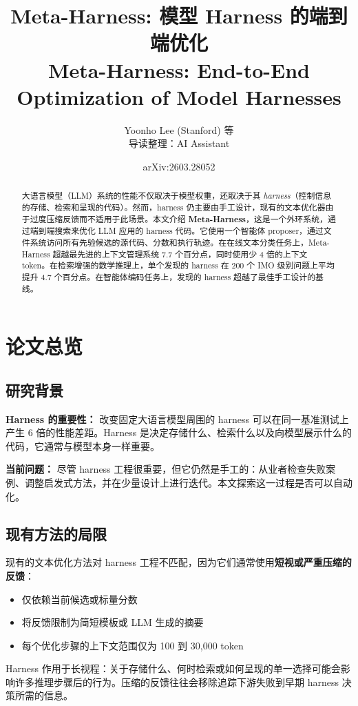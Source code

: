 \documentclass[12pt,a4paper]{article}
\title{\huge Meta-Harness: 模型 Harness 的端到端优化\\[0.5em] \large Meta-Harness: End-to-End Optimization of Model Harnesses}
\author{Yoonho Lee (Stanford) 等\\[0.2cm]\small 导读整理：AI Assistant}
\date{arXiv:2603.28052}
\begin{document}
\maketitle
\begin{abstract}
大语言模型（LLM）系统的性能不仅取决于模型权重，还取决于其 \textit{harness}（控制信息的存储、检索和呈现的代码）。然而，harness 仍主要由手工设计，现有的文本优化器由于过度压缩反馈而不适用于此场景。本文介绍 \textbf{Meta-Harness}，这是一个外环系统，通过端到端搜索来优化 LLM 应用的 harness 代码。它使用一个智能体 proposer，通过文件系统访问所有先验候选的源代码、分数和执行轨迹。在在线文本分类任务上，Meta-Harness 超越最先进的上下文管理系统 7.7 个百分点，同时使用少 4 倍的上下文 token。在检索增强的数学推理上，单个发现的 harness 在 200 个 IMO 级别问题上平均提升 4.7 个百分点。在智能体编码任务上，发现的 harness 超越了最佳手工设计的基线。
\end{abstract}
\tableofcontents
\newpage

\section{论文总览}

\subsection{研究背景}

\textbf{Harness 的重要性：} 改变固定大语言模型周围的 harness 可以在同一基准测试上产生 6 倍的性能差距。Harness 是决定存储什么、检索什么以及向模型展示什么的代码，它通常与模型本身一样重要。

\textbf{当前问题：} 尽管 harness 工程很重要，但它仍然是手工的：从业者检查失败案例、调整启发式方法，并在少量设计上进行迭代。本文探索这一过程是否可以自动化。

\subsection{现有方法的局限}

现有的文本优化方法对 harness 工程不匹配，因为它们通常使用\textbf{短视或严重压缩的反馈}：
\begin{itemize}
    \item 仅依赖当前候选或标量分数
    \item 将反馈限制为简短模板或 LLM 生成的摘要
    \item 每个优化步骤的上下文范围仅为 100 到 30,000 token
\end{itemize}

Harness 作用于长视程：关于存储什么、何时检索或如何呈现的单一选择可能会影响许多推理步骤后的行为。压缩的反馈往往会移除追踪下游失败到早期 harness 决策所需的信息。
\end{document}
